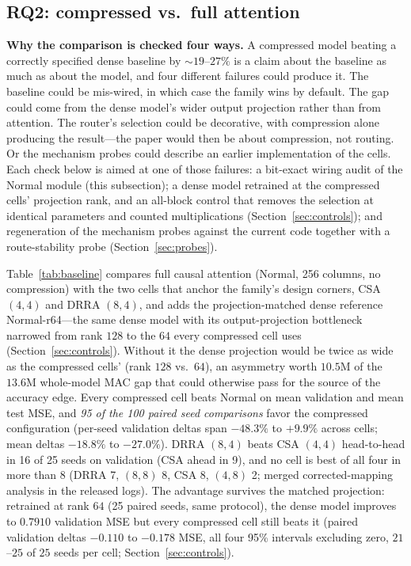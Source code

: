 \subsection{RQ2: compressed vs.\ full attention}
\label{sec:rq2}
\textbf{Why the comparison is checked four ways.} A compressed model beating a
correctly specified dense baseline by ${\sim}19$--$27\%$ is a claim about the
baseline as much as about the model, and four different failures could produce
it. The baseline could be mis-wired, in which case the family wins by default.
The gap could come from the dense model's wider output projection rather than
from attention. The router's selection could be decorative, with
compression alone producing the result---the paper would then be about
compression, not routing. Or the mechanism probes could describe an earlier
implementation of the cells. Each check below is aimed at one of those
failures: a bit-exact wiring audit of the Normal module (this subsection); a
dense model retrained at the compressed cells' projection rank, and an all-block
control that removes the selection at identical parameters and counted
multiplications (Section~\ref{sec:controls}); and regeneration of the mechanism
probes against the current code together with a route-stability probe
(Section~\ref{sec:probes}).

Table~\ref{tab:baseline} compares full causal attention (Normal, 256
columns, no compression) with the two cells that anchor the family's
design corners, CSA $(4,4)$ and DRRA $(8,4)$, and adds the projection-matched
dense reference Normal-r64---the same dense model with its output-projection
bottleneck narrowed from rank $128$ to the $64$ every compressed cell uses
(Section~\ref{sec:controls}). Without it the dense projection would be twice as wide
as the compressed cells' (rank $128$ vs.\ $64$), an asymmetry worth $10.5$M of the
$13.6$M whole-model MAC gap that could otherwise pass for the source of the
accuracy edge.
Every compressed cell beats Normal on mean validation
and mean test MSE, and \emph{95 of the 100 paired seed comparisons}
favor the compressed configuration (per-seed validation deltas span
$-48.3\%$ to $+9.9\%$ across cells; mean deltas $-18.8\%$ to $-27.0\%$).
DRRA $(8,4)$ beats CSA $(4,4)$ head-to-head in 16 of 25 seeds on validation (CSA ahead in 9),
and no cell is best of all four in more than 8 (DRRA 7, $(8,8)$ 8, CSA 8, $(4,8)$ 2;
merged corrected-mapping analysis in the released logs). The advantage survives
the matched projection: retrained at rank $64$ (25 paired seeds, same protocol),
the dense model improves to $0.7910$ validation MSE but every compressed cell
still beats it (paired validation deltas $-0.110$ to $-0.178$ MSE, all four
95\% intervals excluding zero, $21$--$25$ of $25$ seeds per cell;
Section~\ref{sec:controls}).

